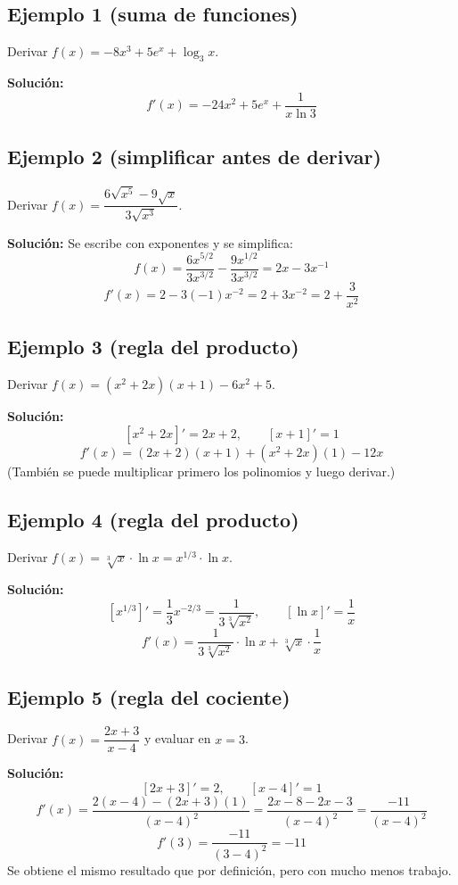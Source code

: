 \documentclass[12pt]{article}
\begin{document}
\subsection{Ejemplo 1 (suma de funciones)}
Derivar $f(x) = -8x^3 + 5e^x + \log_3 x$.

\textbf{Solución:}
\[
f'(x) = -24x^2 + 5e^x + \frac{1}{x \ln 3}
\]

\subsection{Ejemplo 2 (simplificar antes de derivar)}
Derivar $f(x) = \dfrac{6\sqrt{x^5} - 9\sqrt{x}}{3\sqrt{x^3}}$.

\textbf{Solución:} Se escribe con exponentes y se simplifica:
\[
f(x) = \frac{6x^{5/2}}{3x^{3/2}} - \frac{9x^{1/2}}{3x^{3/2}} = 2x - 3x^{-1}
\]
\[
f'(x) = 2 - 3(-1)x^{-2} = 2 + 3x^{-2} = 2 + \frac{3}{x^2}
\]

\subsection{Ejemplo 3 (regla del producto)}
Derivar $f(x) = (x^2 + 2x)(x + 1) - 6x^2 + 5$.

\textbf{Solución:}
\[
[x^2 + 2x]' = 2x + 2, \qquad [x + 1]' = 1
\]
\[
f'(x) = (2x + 2)(x + 1) + (x^2 + 2x)(1) - 12x
\]
(También se puede multiplicar primero los polinomios y luego derivar.)

\subsection{Ejemplo 4 (regla del producto)}
Derivar $f(x) = \sqrt[3]{x} \cdot \ln x = x^{1/3} \cdot \ln x$.

\textbf{Solución:}
\[
\left[x^{1/3}\right]' = \frac{1}{3}x^{-2/3} = \frac{1}{3\sqrt[3]{x^2}}, \qquad [\ln x]' = \frac{1}{x}
\]
\[
f'(x) = \frac{1}{3\sqrt[3]{x^2}} \cdot \ln x + \sqrt[3]{x} \cdot \frac{1}{x}
\]

\subsection{Ejemplo 5 (regla del cociente)}
Derivar $f(x) = \dfrac{2x + 3}{x - 4}$ y evaluar en $x = 3$.

\textbf{Solución:}
\[
[2x + 3]' = 2, \qquad [x - 4]' = 1
\]
\[
f'(x) = \frac{2(x - 4) - (2x + 3)(1)}{(x - 4)^2} = \frac{2x - 8 - 2x - 3}{(x - 4)^2} = \frac{-11}{(x - 4)^2}
\]
\[
f'(3) = \frac{-11}{(3 - 4)^2} = -11
\]
Se obtiene el mismo resultado que por definición, pero con mucho menos trabajo.
\end{document}
